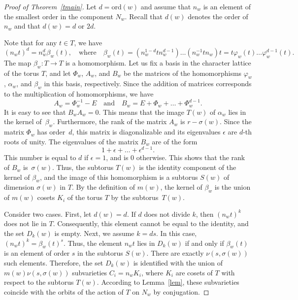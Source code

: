 \documentclass[10pt,a4paper]{amsart}
\newcommand{\ord}{\mathrm{ord}}
\begin{document}
\begin{proof}[Proof of Theorem~\ref{tmain}]
Let $d=\ord(w)$ and assume that $n_w$ is an element of the smallest order in the component $N_w$. Recall that $d(w)$ denotes the order of $n_w$ and that $d(w)=d$ or $2d$.

Note that for any $t\in T$, we have
$$
(n_wt)^d=n_w^d\beta_w(t), \quad \text{where} \quad \beta_w(t)=(n_w^{1-d}tn_w^{d-1})\ldots(n_w^{-1}tn_w)t=t\varphi_w(t)\ldots\varphi_w^{d-1}(t).
$$
The map $\beta_w\colon T\to T$ is a homomorphism. Let us fix a basis in the character lattice of the torus $T$, and let $\Phi_w$, $A_w$, and $B_w$ be the matrices of the homomorphisms $\varphi_w$, $\alpha_w$, and $\beta_w$ in this basis, respectively. Since the addition of matrices corresponds to the multiplication of homomorphisms, we have
$$
A_w=\Phi_w^{-1}-E \quad \text{and} \quad B_w=E+\Phi_w+\ldots+\Phi_w^{d-1}.
$$
It is easy to see that $B_wA_w=0$. This means that the image $T(w)$ of $\alpha_w$ lies in the kernel of~$\beta_w$. Furthermore, the rank of the matrix $A_w$ is $r-\sigma(w)$. Since the matrix $\Phi_w$ has order~$d$, this matrix is diagonalizable and its eigenvalues $\epsilon$ are $d$-th roots of unity. The eigenvalues of the matrix $B_w$ are of the form
$$
1+\epsilon+\ldots+\epsilon^{d-1}.
$$
This number is equal to $d$ if $\epsilon=1$, and is $0$ otherwise. This shows that the rank of $B_w$ is~$\sigma(w)$. Thus, the subtorus $T(w)$ is the identity component of the kernel of $\beta_w$, and the image of this homomorphism is a subtorus $S(w)$ of dimension $\sigma(w)$ in $T$. By the definition of $m(w)$, the kernel of $\beta_w$ is the union of $m(w)$ cosets $K_i$ of the torus $T$ by the subtorus~$T(w)$.

\smallskip

Consider two cases. First, let $d(w)=d$. If $d$ does not divide $k$, then $(n_wt)^k$ does not lie in $T$. Consequently, this element cannot be equal to the identity, and the set $D_k(w)$ is empty. Next, we assume $k=ds$. In this case, $(n_wt)^k=\beta_w(t)^s$. Thus, the element $n_wt$ lies in $D_k(w)$ if and only if $\beta_w(t)$ is an element of order $s$ in the subtorus $S(w)$. There are exactly $\nu(s,\sigma(w))$ such elements. Therefore, the set $D_k(w)$ is identified with the union of $m(w)\nu(s,\sigma(w))$ subvarieties $C_i=n_wK_i$, where $K_i$ are cosets of $T$ with respect to the subtorus $T(w)$. According to Lemma~\ref{lem}, these subvarieties coincide with the orbits of the action of $T$ on $N_w$ by conjugation.

\smallskip


\end{proof}
\end{document}
